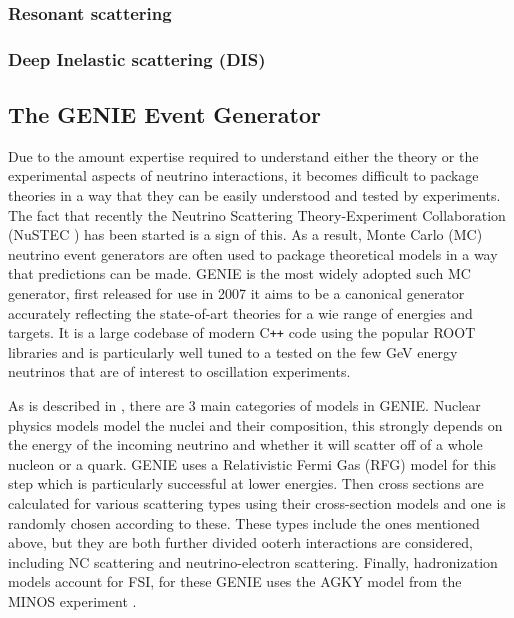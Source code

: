 \documentclass[a4paper,12pt]{article}
\begin{document}
\subsubsection{Resonant scattering}

\subsubsection{Deep Inelastic scattering (DIS)}

\subsection{The GENIE Event Generator \cite{andreopoulosGENIENeutrinoMonte2010}}
Due to the amount expertise required to understand either the theory or the experimental aspects of neutrino interactions, it becomes difficult to package theories in a way that they can be easily understood and tested by experiments.
The fact that recently the Neutrino Scattering Theory-Experiment Collaboration (NuSTEC \cite{alvarez-rusoNuSTEC11NeutrinoScattering2018}) has been started is a sign of this.
As a result, Monte Carlo (MC) neutrino event generators are often used to package theoretical models in a way that predictions can be made.
GENIE is the most widely adopted such MC generator, first released for use in 2007 it aims to be a canonical generator accurately reflecting the state-of-art theories for a wie range of energies and targets.
It is a large codebase of modern C\texttt{++} code using the popular ROOT libraries\cite{brunROOTObjectOriented1997} and is particularly well tuned to a tested on the few \si{GeV} energy neutrinos that are of interest to oscillation experiments.

As is described in \cite{andreopoulosGENIENeutrinoMonte2010}, there are 3 main categories of models in GENIE.
Nuclear physics models model the nuclei and their composition, this strongly depends on the energy of the incoming neutrino and whether it will scatter off of a whole nucleon or a quark.
GENIE uses a Relativistic Fermi Gas (RFG) model for this step which is particularly successful at lower energies.
Then cross sections are calculated for various scattering types using their cross-section models and one is randomly chosen according to these.
These types include the ones mentioned above, but they are both further divided ooterh interactions are considered, including NC scattering and neutrino-electron scattering.
Finally, hadronization models account for FSI, for these GENIE uses the AGKY model from the MINOS experiment \cite{HadronizationModelMINOS}.
\end{document}
